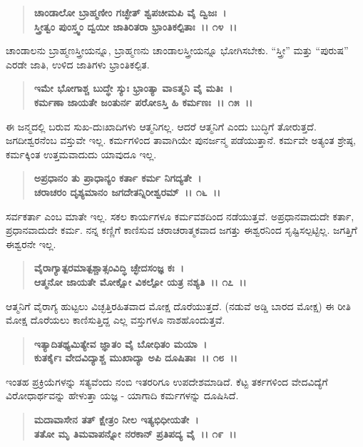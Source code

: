 \begin{verse}
\textbf{ಚಾಂಡಾಲೋ ಬ್ರಾಹ್ಮಣೀಂ ಗಚ್ಛೇತ್ ಶ್ವಪಚೀಮಪಿ ವೈ ದ್ವಿಜಃ~।}\\\textbf{ಸ್ತ್ರೀತ್ವಂ ಪುಂಸ್ತ್ವಂ ದ್ವಯೀ ಜಾತಿರಿತರಾ ಭ್ರಾಂತಿಕಲ್ಪಿತಾಃ~।। ೧೪~।।}
\end{verse}

ಚಾಂಡಾಲನು ಬ್ರಾಹ್ಮಣಸ್ತ್ರೀಯನ್ನೂ, ಬ್ರಾಹ್ಮಣನು ಚಾಂಡಾಲಸ್ತ್ರೀಯನ್ನೂ ಭೋಗಿಸಬೇಕು. “ಸ್ತ್ರೀ” ಮತ್ತು “ಪುರುಷ” ಎರಡೇ ಜಾತಿ, ಉಳಿದ ಜಾತಿಗಳು ಭ್ರಾಂತಿಕಲ್ಪಿತ.

\begin{verse}
\textbf{ಇಮೇ ಭೋಗಾಶ್ಚ ಬುದ್ಧೇ ಸ್ಯುಃ ಭ್ರಾಂತ್ಯಾ ವಾಽತ್ಮನಿ ವೈ ಮತಿಃ~।}\\\textbf{ಕರ್ಮಣಾ ಜಾಯತೇ ಜಂತುರ್ನ ಪರೋಽಸ್ತಿ ಹಿ ಕರ್ಮಣಃ~।। ೧೫~।।}
\end{verse}

ಈ ಜನ್ಮದಲ್ಲಿ ಬರುವ ಸುಖ-ದುಃಖಾದಿಗಳು ಆತ್ಮನಿಗಲ್ಲ. ಆದರೆ ಆತ್ಮನಿಗೆ ಎಂದು ಬುದ್ಧಿಗೆ ತೋರುತ್ತದೆ. ಜಗದೀಶ್ವರನೆಂಬ ವಸ್ತುವೇ ಇಲ್ಲ. ಕರ್ಮಗಳಿಂದ ತಾವಾಗಿಯೇ ಪುನರ್ಜನ್ಮ ಪಡೆಯುತ್ತಾನೆ. ಕರ್ಮವೇ ಅತ್ಯಂತ ಶ್ರೇಷ್ಠ, ಕರ್ಮಕ್ಕಿಂತ ಉತ್ತಮವಾದುದು ಯಾವುದೂ ಇಲ್ಲ.

\begin{verse}
\textbf{ಅಪ್ರಧಾನಂ ತು ಪ್ರಾಧಾನ್ಯಂ ಕರ್ತಾ ಕರ್ಮ ನಿಗದ್ಯತೇ~।}\\\textbf{ಚರಾಚರಂ ದೃಶ್ಯಮಾನಂ ಜಗದೇತನ್ನಿರೀಶ್ವರಮ್~।। ೧೬~।।}
\end{verse}

ಸರ್ವಕರ್ತಾ ಎಂಬ ಮಾತೇ ಇಲ್ಲ. ಸಕಲ ಕಾರ್ಯಗಳೂ ಕರ್ಮವಶದಿಂದ ನಡೆಯುತ್ತವೆ. ಅಪ್ರಧಾನವಾದುದೇ ಕರ್ತಾ, ಪ್ರಧಾನವಾದುದೇ ಕರ್ಮ. ನನ್ನ ಕಣ್ಣಿಗೆ ಕಾಣಿಸುವ ಚರಾಚರಾತ್ಮಕವಾದ ಜಗತ್ತು ಈಶ್ವರನಿಂದ ಸೃಷ್ಟಿಸಲ್ಪಟ್ಟಿಲ್ಲ. ಜಗತ್ತಿಗೆ ಈಶ್ವರನೇ ಇಲ್ಲ.

\begin{verse}
\textbf{ವೈರಾಗ್ಯಾತ್ಪರಮಾತ್ಪಶ್ಚಾತ್ಸಂವಿದ್ಧಿ ಚ್ಛೇದಸಂಜ್ಞ ಕಃ~।}\\\textbf{ಆತ್ಮನೋ ಜಾಯತೇ ಮೋಕ್ಷೋ ವಿಕಲ್ಪೋ ಯತ್ರ ನಶ್ಯತಿ~।। ೧೭~।।}
\end{verse}

ಆತ್ಮನಿಗೆ ವೈರಾಗ್ಯ ಹುಟ್ಟಲು ವಿಚ್ಛತ್ತಿರಹಿತವಾದ ಮೋಕ್ಷ ದೊರೆಯುತ್ತದೆ. (ನಡುವೆ ಅಡ್ಡಿ ಬಾರದ  ಮೋಕ್ಷ) ಈ ರೀತಿ ಮೋಕ್ಷ ದೊರೆಯಲು ಕಾಣಿಸುತ್ತಿದ್ದ ಎಲ್ಲ ವಸ್ತುಗಳೂ ನಾಶಹೊಂದುತ್ತವೆ.

\begin{verse}
\textbf{ಇತ್ಯಾದಿತಥ್ಯಮಿತ್ಯೇವ ಜ್ಞಾತಂ ವೈ ಬೋಧಿತಂ ಮಯಾ~।}\\\textbf{ಕುತರ್ಕೈಃ ವೇದವಿದ್ಯಾಶ್ಚ ಮುಖಾದ್ಯಾ ಅಪಿ ದೂಷಿತಾಃ~।। ೧೮~।।}
\end{verse}

ಇಂತಹ ಪ್ರಕ್ರಿಯೆಗಳನ್ನು ಸತ್ಯವೆಂದು ನಂಬಿ ಇತರರಿಗೂ ಉಪದೇಶಮಾಡಿದೆ. ಕೆಟ್ಟ ತರ್ಕಗಳಿಂದ ವೇದವಿದ್ಯೆಗೆ ವಿರೋಧಾರ್ಥವನ್ನು ಹೇಳುತ್ತಾ ಯಜ್ಞ - ಯಾಗಾದಿ ಕರ್ಮಗಳನ್ನು ದೂಷಿಸಿದೆ.

\begin{verse}
\textbf{ಮದಾವಾಸೇನ ತತ್ ಕ್ಷೇತ್ರಂ ನೀಲ ಇತ್ಯಭಿಧೀಯತೇ~।}\\\textbf{ತತೋ ಮೃ ತಿಮವಾಪನ್ನೋ ನರಕಾನ್ ಪ್ರತಿಪದ್ಯ ವೈ~।। ೧೯~।। }
\end{verse}

